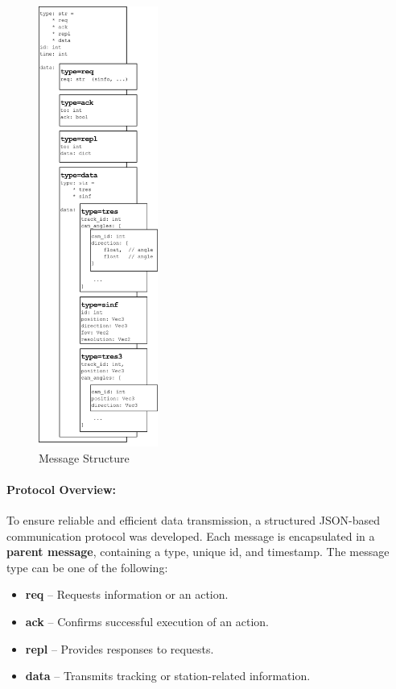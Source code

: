 \begin{figure}
	\centering
	\vspace{-60pt} %
	\includegraphics[width=0.35\textwidth]{figures/SS_Protocol_Message}
	\caption{Message Structure}
	\label{fig:ssprotocolmessage}
\end{figure}


\paragraph{Protocol Overview:}

To ensure reliable and efficient data transmission, a structured JSON-based communication protocol was developed. Each message is encapsulated in a \textbf{parent message}, containing a type, unique \acrfull{id}, and timestamp. The message type can be one of the following:

\begin{itemize}
	\item \textbf{req} – Requests information or an action.
	\item \textbf{ack} – Confirms successful execution of an action.
	\item \textbf{repl} – Provides responses to requests.
	\item \textbf{data} – Transmits tracking or station-related information.
\end{itemize}

